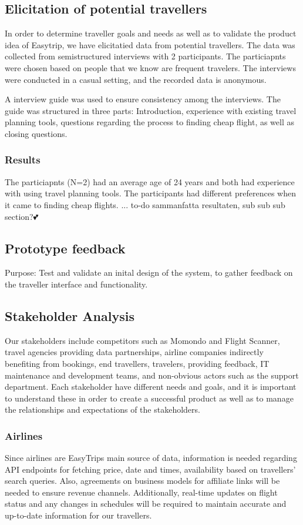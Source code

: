 \subsection{Elicitation of potential travellers}
In order to determine traveller goals and needs as well as to validate the product idea of Easytrip, we have elicitatied data from potential travellers. The data was collected from semistructured interviews with 2 participants. The particiapnts were chosen based on people that we know are frequent travelers. The interviews were conducted in a casual setting, and the recorded data is anonymous.

A interview guide was used to ensure consistency among the interviews. The guide was structured in three parts: Introduction, experience with existing travel planning tools, questions regarding the process to finding cheap flight, as well as closing questions. 

\subsubsection{Results}
The particiapnts (N=2) had an average age of 24 years and both had experience with using travel planning tools. The participants had different preferences when it came to finding cheap flights. 
... to-do sammanfatta resultaten, sub sub sub section?💕

\subsection{Prototype feedback}
Purpose: Test and validate an inital design of the system, to gather feedback on the traveller interface and functionality.

\subsection{Stakeholder Analysis}
Our stakeholders include competitors such as Momondo and Flight Scanner, travel agencies providing data partnerships, airline companies indirectly benefiting from bookings, end travellers, travelers, providing feedback, IT maintenance and development teams, and non-obvious actors such as the support department. Each stakeholder have different needs and goals, and it is important to understand these in order to create a successful product as well as to manage the relationships and expectations of the stakeholders.

\subsubsection{Airlines}
Since airlines are EasyTrips main source of data, information is needed regarding API endpoints for fetching price, date and times, availability based on travellers' search queries. Also, agreements on business models for affiliate links will be needed to ensure revenue channels. Additionally, real-time updates on flight status and any changes in schedules will be required to maintain accurate and up-to-date information for our travellers.

